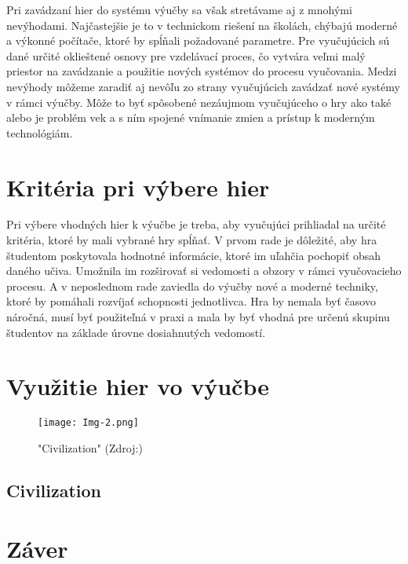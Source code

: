 \documentclass[10pt,twoside,slovak,a4paper]{article}
\begin{document}
Pri zavádzaní hier do systému výučby sa však stretávame aj z mnohými nevýhodami. Najčastejšie je to v technickom riešení na školách, chýbajú moderné a výkonné počítače, ktoré by spĺňali požadované parametre. Pre vyučujúcich sú dané určité oklieštené osnovy pre vzdelávací proces, čo vytvára veľmi malý priestor na zavádzanie a použitie nových systémov do procesu vyučovania.  Medzi nevýhody môžeme zaradiť aj nevôľu zo strany vyučujúcich zavádzať nové systémy v rámci výučby. Môže to byť spôsobené nezáujmom vyučujúceho o hry ako také alebo je problém vek a s ním spojené vnímanie zmien a prístup k moderným technológiám.

\section{Kritéria pri výbere hier} \label{kriteria}

Pri výbere vhodných hier k výučbe je treba, aby vyučujúci prihliadal na určité kritéria, ktoré by mali vybrané hry spĺňať. V prvom rade je dôležité, aby hra študentom poskytovala hodnotné informácie, ktoré im uľahčia pochopiť obsah daného učiva. Umožnila im rozširovať si vedomosti a obzory v rámci vyučovacieho procesu. A v neposlednom rade zaviedla do výučby nové a moderné techniky, ktoré by pomáhali rozvíjať schopnosti jednotlivca. Hra by nemala byť časovo náročná, musí byť použiteľná v praxi a mala by byť vhodná pre určenú skupinu študentov na základe úrovne dosiahnutých vedomostí.

\section{Využitie hier vo výučbe} \label{vyuzitie}

\begin{figure}[tbh]
	\centering
	\texttt{[image: Img-2.png]}
	\caption{"Civilization" (Zdroj:\cite{Img-Civil})}
	\label{obr-2}
\end{figure}

\subsection{Civilization} \label{hra-2}


\section{Záver}



\end{document}
